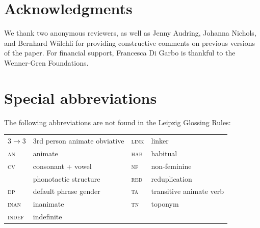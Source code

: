 \documentclass[output=collectionpaper]{langsci/langscibook}
\begin{document}
\section*{Acknowledgments} 
We thank two anonymous reviewers, as well as Jenny Audring, Johanna Nichols, and Bernhard W\"alchli for providing constructive comments on previous versions of the paper. For financial support, Francesca Di Garbo is thankful to the Wenner-Gren Foundations.

\section*{Special abbreviations}
\noindent The following abbreviations are not found in the Leipzig Glossing Rules:
\medskip

\noindent
\begin{tabular}{llll}
  3$ \rightarrow $3	&	3rd person animate obviative	&  	  \textsc{link}	&	linker	\\
  \textsc{an}	&	animate	& 	 \textsc{hab}	&	habitual	\\
  \textsc{cv} 	&	 consonant + vowel	&	\textsc{nf}	&	non-feminine	\\
	&	 phonotactic structure 	&	\textsc{red}	&	reduplication	\\
  \textsc{dp} 	&	default phrase gender	& \textsc{ta}	&	transitive animate verb	\\
  \textsc{inan}	&	inanimate	&	\textsc{tn}	&	toponym	\\
  \textsc{indef}	&	indefinite	&&\\
\end{tabular}

\sloppy
\printbibliography[heading=subbibliography,notkeyword=this]


\end{document}
